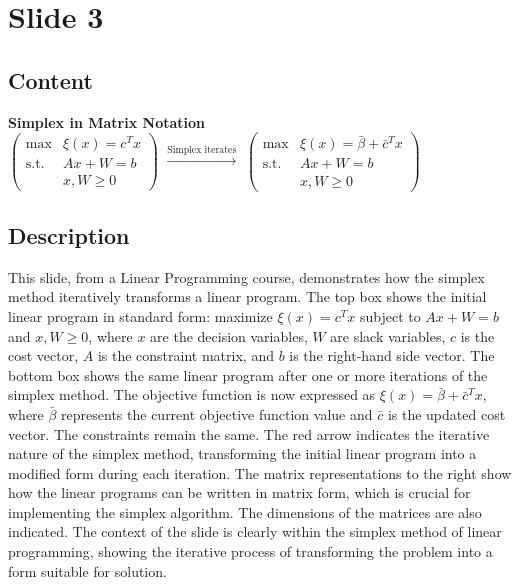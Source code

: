 \documentclass{article}%
\begin{document}
%
\newpage%
\section{Slide 3}%
\label{sec:Slide3}%
\subsection{Content}%

\textbf{Simplex in Matrix Notation} \\
$\begin{pmatrix}
\max & \xi(x) = c^T x \\
\text{s.t.} & Ax + W = b \\
& x, W \ge 0
\end{pmatrix}$
$\xrightarrow{\text{Simplex iterates}}$
$\begin{pmatrix}
\max & \xi(x) = \bar{\beta} + \bar{c}^T x \\
\text{s.t.} & Ax + W = b \\
& x, W \ge 0
\end{pmatrix}$
%
\subsection{Description}%
This slide, from a Linear Programming course, demonstrates how the simplex method iteratively transforms a linear program. The top box shows the initial linear program in standard form: maximize $\xi(x) = c^T x$ subject to $Ax + W = b$ and $x, W \ge 0$, where $x$ are the decision variables, $W$ are slack variables, $c$ is the cost vector, $A$ is the constraint matrix, and $b$ is the right-hand side vector.  The bottom box shows the same linear program after one or more iterations of the simplex method. The objective function is now expressed as $\xi(x) = \bar{\beta} + \bar{c}^T x$, where $\bar{\beta}$ represents the current objective function value and $\bar{c}$ is the updated cost vector. The constraints remain the same. The red arrow indicates the iterative nature of the simplex method, transforming the initial linear program into a modified form during each iteration. The matrix representations to the right show how the linear programs can be written in matrix form, which is crucial for implementing the simplex algorithm. The dimensions of the matrices are also indicated. The context of the slide is clearly within the simplex method of linear programming, showing the iterative process of transforming the problem into a form suitable for solution.%
\end{document}
